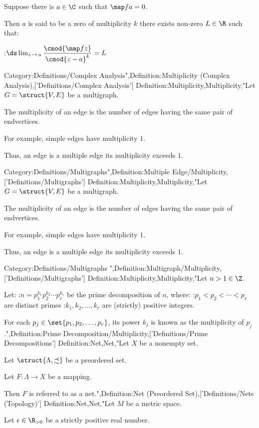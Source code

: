 Suppose there is $a \in \C$ such that $\map f a = 0$.

Then $a$ is said to be a zero of multiplicity $k$  there exists non-zero $L \in \R$ such that:

:$\ds \lim_{z \mathop \to a} \dfrac {\cmod {\map f z} } {\cmod {z - a}^k} = L$



Category:Definitions/Complex Analysis",Definition:Multiplicity (Complex Analysis),['Definitions/Complex Analysis']
Definition:Multiplicity,Multiplicity,"Let $G = \struct {V, E}$ be a multigraph.

The multiplicity of an edge is the number of edges having the same pair of endvertices.


For example, simple edges have multiplicity $1$.

Thus, an edge is a multiple edge  its multiplicity exceeds $1$.

Category:Definitions/Multigraphs",Definition:Multiple Edge/Multiplicity,['Definitions/Multigraphs']
Definition:Multiplicity,Multiplicity,"Let $G = \struct {V, E}$ be a multigraph.

The multiplicity of an edge is the number of edges having the same pair of endvertices.


For example, simple edges have multiplicity $1$.

Thus, an edge is a multiple edge  its multiplicity exceeds $1$.

Category:Definitions/Multigraphs
",Definition:Multigraph/Multiplicity,['Definitions/Multigraphs']
Definition:Multiplicity,Multiplicity,"Let $n > 1 \in \Z$.

Let:
:$n = p_1^{k_1} p_2^{k_2} \cdots p_r^{k_r}$
be the prime decomposition of $n$, where:
:$p_1 < p_2 < \cdots < p_r$ are distinct primes
:$k_1, k_2, \ldots, k_r$ are (strictly) positive integers.


For each $p_j \in \set {p_1, p_2, \ldots, p_r}$, its power $k_j$ is known as the multiplicity of $p_j$.",Definition:Prime Decomposition/Multiplicity,['Definitions/Prime Decompositions']
Definition:Net,Net,"Let $X$ be a nonempty set.

Let $\struct {\Lambda, \precsim}$ be a preordered set.

Let $F: \Lambda \to X$ be a mapping.


Then $F$ is referred to as a net.",Definition:Net (Preordered Set),['Definitions/Nets (Topology)']
Definition:Net,Net,"Let $M$ be a metric space.

Let $\epsilon \in \R_{>0}$ be a strictly positive real number.


